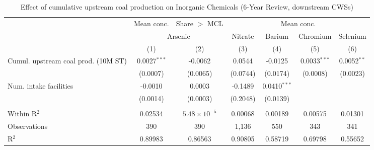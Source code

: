 
\begin{table}[htbp]
   
   \caption{\label{tab:6yr_huc02fe_inorg} Effect of cumulative upstream coal production on Inorganic Chemicals (6-Year Review, downstream CWSs)}
   \bigskip
   
   \centering
   
   \begin{adjustbox}{width = \textwidth, center}
      
      
      \begin{tabular}{lcccccc}
         \toprule
         
          & Mean conc. & Share $>$ MCL & \multicolumn{4}{c}{Mean conc.}\\
         
          & \multicolumn{2}{c}{Arsenic} & Nitrate & Barium & Chromium & Selenium \\ 
         
                                             & (1)            & (2)                   & (3)           & (4)            & (5)            & (6)\\  
         
         \midrule 
         Cumul. upstream coal prod. (10M ST) & 0.0027$^{***}$ & -0.0062               & 0.0544        & -0.0125        & 0.0033$^{***}$ & 0.0052$^{**}$\\   
                                             & (0.0007)       & (0.0065)              & (0.0744)      & (0.0174)       & (0.0008)       & (0.0023)\\   
         Num. intake facilities              & -0.0010        & 0.0003                & -0.1489       & 0.0410$^{***}$ &                &   \\   
                                             & (0.0014)       & (0.0003)              & (0.2048)      & (0.0139)       &                &   \\   
         
          \\
         
         Within R$^2$                        & 0.02534        & $5.48\times 10^{-5}$  & 0.00068       & 0.00189        & 0.00575        & 0.01301\\  
         Observations                        & 390            & 390                   & 1,136         & 550            & 343            & 341\\  
         R$^2$                               & 0.89983        & 0.86563               & 0.90805       & 0.58719        & 0.69798        & 0.55652\\  
         

\end{tabular}
\end{adjustbox}
\end{table}
